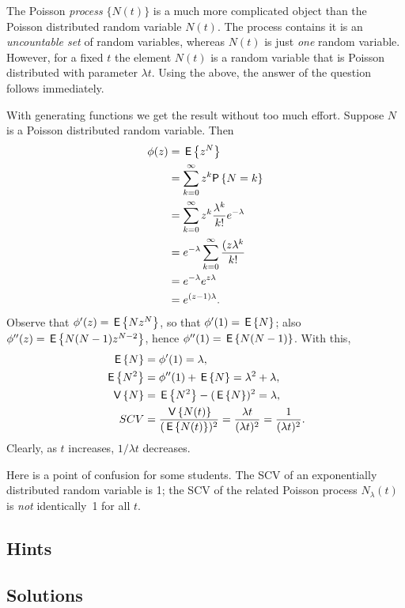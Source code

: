 \begin{question}
\begin{solution}
The Poisson \emph{process} $\{N(t)\}$ is a much more complicated
object than the Poisson distributed random variable $N(t)$. The
process contains it is an \emph{ uncountable set} of random variables,
whereas $N(t)$ is just \emph{one} random variable. However, for a
fixed $t$ the element $N(t)$ is a random variable that is Poisson
distributed with parameter $\lambda t$. Using the above, the answer of
the question follows immediately.


With generating functions we get the result without too much
effort. Suppose $N$ is a Poisson distributed random variable. Then 
\begin{equation*}
  \begin{split}
\phi(z)
&=  \E{z^N} \\
&= \sum_{k=0}^\infty z^k \P{N=k} \\
&= \sum_{k=0}^\infty z^k \frac{\lambda^k}{k!} e^{-\lambda}  \\
&= e^{-\lambda} \sum_{k=0}^\infty  \frac{(z\lambda^k}{k!}  \\
&= e^{-\lambda} e^{z \lambda} \\
&= e^{(z-1)\lambda}.
  \end{split}
\end{equation*}
Observe that $\phi'(z) = \,\mathsf{E}\left\{N z^N\right\}$, so that $\phi'(1)=\,\mathsf{E}\left\{N\right\}$; also
$\phi''(z)=\,\mathsf{E}\left\{N(N-1)z^{N-2}\right\}$, hence $\phi''(1)=\,\mathsf{E}\left\{N(N-1)\right\}$. With this,
  \begin{align*}
    \,\mathsf{E}\left\{N\right\} &= \phi'(1)= \lambda,\\
\,\mathsf{E}\left\{N^2\right\} &= \phi''(1) + \,\mathsf{E}\left\{N\right\} = \lambda^2 + \lambda,\\
\,\mathsf{V}\left\{N\right\} &= \,\mathsf{E}\left\{N^2\right\}-(\,\mathsf{E}\left\{N\right\})^2 = \lambda,\\
SCV &= \frac{\,\mathsf{V}\left\{N(t)\right\}}{(\,\mathsf{E}\left\{N(t)\right\})^2} = \frac{\lambda t}{(\lambda t)^2} = \frac1{(\lambda t)^2}.
  \end{align*}
Clearly, as $t$
increases, $1/\lambda t$ decreases.

Here is a point of confusion for some students. The SCV of an
exponentially distributed random variable is 1; the SCV of the related
Poisson process $N_\lambda(t)$ is \emph{not} identically~1 for all
$t$.

\end{solution}
\end{question}

\subsection*{Hints}

\subsection*{Solutions}



